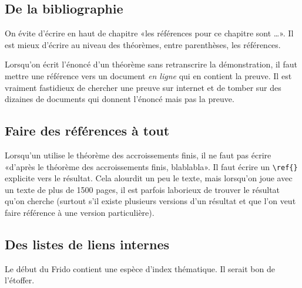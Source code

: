 \subsection{De la bibliographie}

On évite d'écrire en haut de chapitre «les références pour ce chapitre sont \ldots». Il est mieux d'écrire au niveau des théorèmes, entre parenthèses, les références.

Lorsqu'on écrit l'énoncé d'un théorème sans retranscrire la démonstration, il faut mettre une référence vers un document \emph{en ligne} qui en contient la preuve. Il est vraiment fastidieux de chercher une preuve sur internet et de tomber sur des dizaines de documents qui donnent l'énoncé mais pas la preuve.

\subsection{Faire des références à tout}

Lorsqu'un utilise le théorème des accroissements finis, il ne faut pas écrire «d'après le
théorème des accroissements finis, blablabla». Il faut écrire un \verb+\ref{}+ explicite
vers le résultat. Cela alourdit un peu le texte, mais lorsqu'on joue avec un texte de plus
de 1500 pages, il est parfois laborieux de trouver le résultat qu'on cherche (surtout s'il existe plusieurs versions d'un résultat et que l'on veut faire référence à une version particulière).

\subsection{Des listes de liens internes}

Le début du Frido contient une espèce d'index thématique. Il serait bon de l'étoffer.

